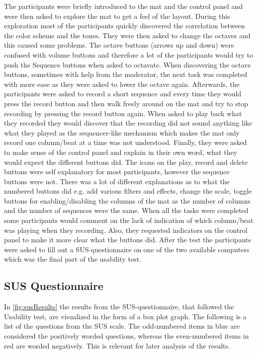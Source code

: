 The participants were briefly introduced to the mat and the control panel and were then asked to explore the mat to get a feel of the layout. During this exploration most of the participants quickly discovered the correlation between the color scheme and the tones. They were then asked to change the octaves and this caused some problems. The octave buttons (arrows up and down) were confused with volume buttons and therefore a lot of the participants would try to push the Sequence buttons when asked to octavate. When discovering the octave buttons, sometimes with help from the moderator, the next task was completed with more ease as they were asked to lower the octave again. Afterwards, the participants were asked to record a short sequence and every time they would press the record button and then walk freely around on the mat and try to stop recording by pressing the record button again. When asked to play back what they recorded they would discover that the recording did not sound anything like what they played as the sequencer-like mechanism which makes the mat only record one column/beat at a time was not understood. Finally, they were asked to make sense of the control panel and explain in their own word, what they would expect the different buttons did. The icons on the play, record and delete buttons were self explanatory for most participants, however the sequence buttons were not. There was a lot of different explanations as to what the numbered buttons did e.g. add various filters and effects, change the scale, toggle buttons for enabling/disabling the columns of the mat as the number of columns and the number of sequences were the same. When all the tasks were completed some participants would comment on the lack of indication of which column/beat was playing when they recording. Also, they requested indicators on the control panel to make it more clear what the buttons did. After the test the participants were asked to fill out a SUS-questionnaire on one of the two available computers which was the final part of the usability test.

\subsection{SUS Questionnaire}
In \autoref{fig:susResults} the results from the SUS-questionnaire, that followed the Usability test, are visualized in the form of a box plot graph. The following is a list of the questions from the SUS scale. The odd-numbered items in blue are considered the positively worded questions, whereas the even-numbered items in red are worded negatively. This is relevant for later analysis of the results.\\

